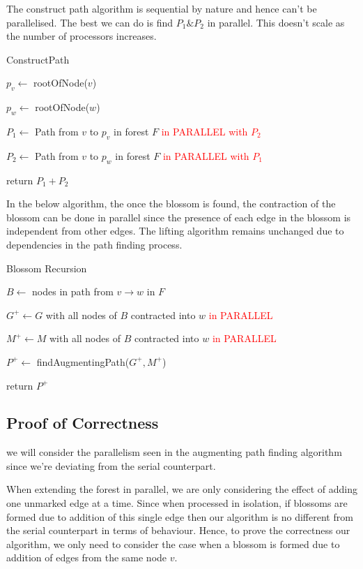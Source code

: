 \documentclass{article}
\begin{document}
The construct path algorithm is sequential by nature and hence can't be parallelised. The best we can do is find $P_1 \& P_2$ in parallel. This doesn't scale as the number of processors increases.

\begin{algorithm}[!h]
\caption{ConstructPath}

$p_v \leftarrow$ rootOfNode($v$)

$p_w \leftarrow$ rootOfNode($w$)

$P_1 \leftarrow$ Path from $v$ to $p_v$ in forest $F$ \textcolor{red}{in PARALLEL with $P_2$}

$P_2 \leftarrow$ Path from $v$ to $p_w$ in forest $F$ \textcolor{red}{in PARALLEL with $P_1$}

return $P_1 + P_2$
\end{algorithm}

In the below algorithm, the once the blossom is found, the contraction of the blossom can be done in parallel since the presence of each edge in the blossom is independent from other edges. The lifting algorithm remains unchanged due to dependencies in the path finding process.

\begin{algorithm}[!h]
\caption{Blossom Recursion}

$B \leftarrow$ nodes in path from $v \to w$ in $F$

$G^+ \leftarrow G$ with all nodes of $B$ contracted into $w$ \textcolor{red}{in PARALLEL}

$M^+ \leftarrow M$ with all nodes of $B$ contracted into $w$ \textcolor{red}{in PARALLEL}

$P^+ \leftarrow$ findAugmentingPath($G^+, M^+$)


return $P^+$
\end{algorithm}

\subsection{Proof of Correctness}
we will consider the parallelism seen in the augmenting path finding algorithm since we're deviating from the serial counterpart.

When extending the forest in parallel, we are only considering the effect of adding one unmarked edge at a time. Since when processed in isolation, if blossoms are formed due to addition of this single edge then our algorithm is no different from the serial counterpart in terms of behaviour. Hence, to prove the correctness our algorithm, we only need to consider the case when a blossom is formed due to addition of edges from the same node $v$.
\end{document}
